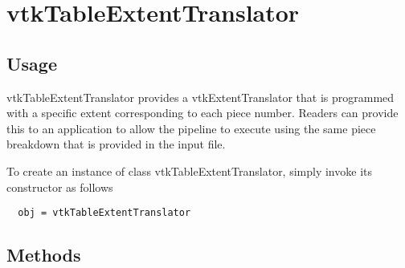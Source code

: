 \section{vtkTableExtentTranslator}

\subsection{Usage}

 vtkTableExtentTranslator provides a vtkExtentTranslator that is
 programmed with a specific extent corresponding to each piece
 number.  Readers can provide this to an application to allow the
 pipeline to execute using the same piece breakdown that is provided
 in the input file.

To create an instance of class vtkTableExtentTranslator, simply
invoke its constructor as follows
\begin{verbatim}
  obj = vtkTableExtentTranslator
\end{verbatim}
\subsection{Methods}

